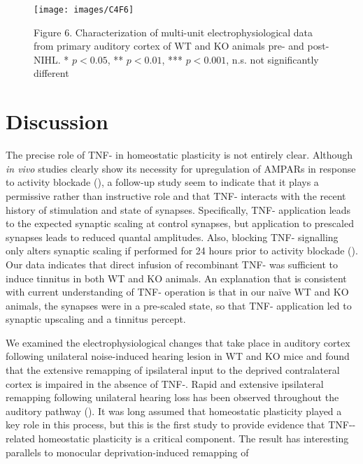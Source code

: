 \begin{figure}
	\centering
		\texttt{[image: images/C4F6]}
	\begin{changemargin}{1in}{1in}
	\footnotesize{Figure 6. Characterization of multi-unit electrophysiological data from primary auditory cortex of WT and KO animals pre- and post-NIHL. * $p<0.05$, ** $p<0.01$, *** $p<0.001$, n.s. not significantly different}
	\end{changemargin}
\end{figure}

\section{Discussion}

The precise role of TNF-\textalpha{} in homeostatic plasticity is not entirely clear. Although \textit{in vivo} studies clearly show its necessity for upregulation of AMPARs in response to activity blockade (\cite{Stellwagen2006}), a follow-up study seem to indicate that it plays a permissive rather than instructive role and that TNF-\textalpha{} interacts with the recent history of stimulation and state of synapses. Specifically, TNF-\textalpha{} application leads to the expected synaptic scaling at control synapses, but application to prescaled synapses leads to reduced quantal amplitudes. Also, blocking TNF-\textalpha{} signalling only alters synaptic scaling if performed for 24 hours prior to activity blockade (\cite{Steinmetz2010}). Our data indicates that direct infusion of recombinant TNF-\textalpha{} was sufficient to induce tinnitus in both WT and KO animals. An explanation that is consistent with current understanding of TNF-\textalpha{} operation is that in our na\"ive WT and KO animals, the synapses were in a pre-scaled state, so that TNF-\textalpha{} application led to synaptic upscaling and a tinnitus percept.

We examined the electrophysiological changes that take place in auditory cortex following unilateral noise-induced hearing lesion in WT and KO mice and found that the extensive remapping of ipsilateral input to the deprived contralateral cortex is impaired in the absence of TNF-\textalpha{}. Rapid and extensive ipsilateral remapping following unilateral hearing loss has been observed throughout the auditory pathway (\cite{Mossop2000}). It was long assumed that homeostatic plasticity played a key role in this process, but this is the  first study to provide evidence that TNF-\textalpha{}-related homeostatic plasticity is a critical component. The result has interesting parallels to monocular deprivation-induced remapping of 


\printbibliography